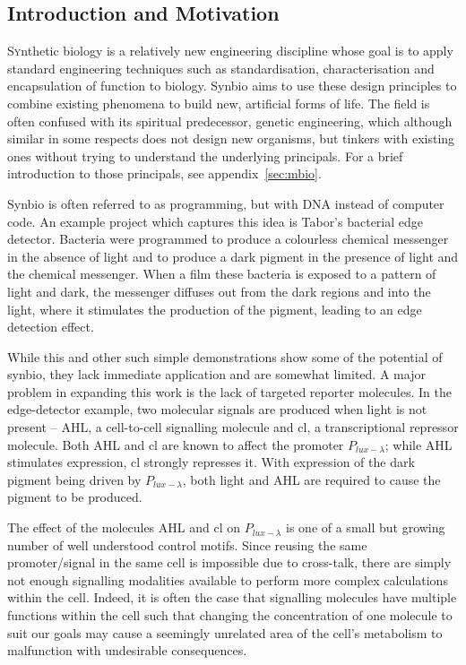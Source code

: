 \documentclass[twoside,a4paper]{article}
\begin{document}
\begin{multicols}{2} %

\section{Introduction and Motivation}

\lettrine[nindent=0em,lines=3]{S}ynthetic biology is a relatively new
engineering discipline whose goal is to apply standard engineering techniques
such as standardisation, characterisation and encapsulation of function to 
biology.
Synbio aims to use these design principles to combine existing phenomena to 
build new, artificial forms of life.
The field is often confused with its spiritual predecessor, genetic 
engineering, which although similar in some respects does not design new
organisms, but tinkers with existing ones without trying to understand the
underlying principals.
For a brief introduction to those principals, see appendix~\ref{sec:mbio}.

Synbio is often referred to as programming, but with DNA instead of computer
code.
An example project which captures this idea is Tabor's bacterial edge
detector\cite{edgeDetector}.
Bacteria were programmed to produce a colourless chemical messenger in the 
absence of light and to produce a dark pigment in the presence of light and the
chemical messenger.
When a film these bacteria is exposed to a pattern of light and dark, the
messenger diffuses out from the dark regions and into the light, where it
stimulates the production of the pigment, leading to an edge detection effect.

While this and other such simple demonstrations show some of the potential 
of synbio, they lack immediate application and are somewhat limited.
A major problem in expanding this work is the lack of targeted reporter
molecules.
In the edge-detector example, two molecular signals are produced when light is 
not present -- AHL, a cell-to-cell signalling molecule and cl, a
transcriptional repressor molecule.
Both AHL and cl are known to affect the promoter $P_{lux-\lambda}$; while AHL 
stimulates expression, cl strongly represses it.
With expression of the dark pigment being driven by $P_{lux-\lambda}$, 
both light and AHL are required to cause the pigment to be produced.

The effect of the molecules AHL and cl on $P_{lux-\lambda}$ is one of a small
but growing number of well understood control motifs.
Since reusing the same promoter/signal in the same cell is impossible due to 
cross-talk, there are simply not enough signalling modalities available to
perform more complex calculations within the cell.
Indeed, it is often the case that signalling molecules have multiple functions
within the cell such that changing the concentration of one molecule to suit
our goals may cause a seemingly unrelated area of the cell's metabolism to
malfunction with undesirable consequences.


\end{multicols}
\end{document}
